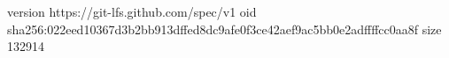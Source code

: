 version https://git-lfs.github.com/spec/v1
oid sha256:022eed10367d3b2bb913dffed8dc9afe0f3ce42aef9ac5bb0e2adffffcc0aa8f
size 132914
